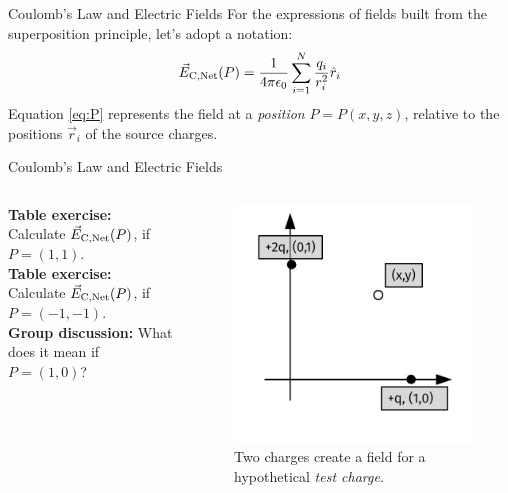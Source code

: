 \documentclass{beamer}
\begin{document}
\begin{frame}{Coulomb’s Law and Electric Fields}
For the expressions of fields built from the superposition principle, let's adopt a notation:
\begin{equation}
\vec{E}_{\rm C,Net}(P) = \frac{1}{4\pi\epsilon_{\rm 0}} \sum_{i = 1}^N \frac{q_i}{r_i^2}\hat{r}_i \label{eq:P}
\end{equation}
Equation \ref{eq:P} represents the field at a \textit{position} $P = P(x,y,z)$, relative to the positions $\vec{r}_i$ of the source charges.
\end{frame}

\begin{frame}{Coulomb’s Law and Electric Fields}
\small
\begin{columns}[T]
\begin{column}{0.5\textwidth}
\textbf{Table exercise:} Calculate $\vec{E}_{\rm C,Net}(P)$, if $P = (1,1)$. \\ \vspace{0.5cm}
\textbf{Table exercise:} Calculate $\vec{E}_{\rm C,Net}(P)$, if $P = (-1,-1)$. \\ \vspace{0.5cm}
\textbf{Group discussion:} What does it mean if $P = (1,0)$? \\ \vspace{0.5cm}
\end{column}
\begin{column}{0.5\textwidth}
\begin{figure}
\includegraphics[width=\textwidth]{figures/NetField4.pdf}
\caption{\label{fig:netfield4} Two charges create a field for a hypothetical \textit{test charge}.}
\end{figure}
\end{column}
\end{columns}
\end{frame}
\end{document}
